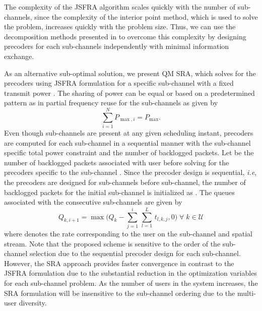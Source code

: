 The complexity of the \ac{JSFRA} algorithm scales quickly with the number of sub-channels, since the complexity of the interior point method, which is used to solve the problem, increases quickly with the problem size. Thus, we can use the decomposition methods presented in \cite{palomar2006tutorial,boyd2011distributed} to overcome this complexity by designing precoders for each sub-channels independently with minimal information exchange.

As an alternative sub-optimal solution, we present \acl{QM} \ac{SRA}, which solves for the precoders using \ac{JSFRA} formulation for a specific sub-channel  with a fixed transmit power . The sharing of power can be equal or based on a predetermined pattern as in partial frequency reuse for the sub-channels as given by
\begin{equation}
\sum_{i=1}^N P_{\max,i} = P_{\max}.
\end{equation}
Even though  sub-channels are present at any given scheduling instant, precoders are computed for each sub-channel in a sequential manner with the sub-channel specific total power constraint  and the number of backlogged packets. Let  be the number of backlogged packets associated with user  before solving for the precoders specific to the sub-channel . Since the precoder design is sequential, \textit{i.e}, the precoders are designed for sub-channels \me{[0,i-1]} before  sub-channel, the number of backlogged packets for the initial sub-channel is initialized as . The queues associated with the consecutive sub-channels are given by
\begin{equation}	\label{eqn-weight}
	Q_{k,i+1} = \max \Big ( Q_k - \sum_{j = 1}^{i} \, \sum_{l = 1}^{L} \, t_{l,k,j} ,0 \Big ) \; \forall \; k \in \mathcal{U}
\end{equation}
where  denotes the rate corresponding to the user  on the  sub-channel and  spatial stream. Note that the proposed scheme is sensitive to the order of the sub-channel selection due to the sequential precoder design for each sub-channel. However, the \ac{SRA} approach provides faster convergence in contrast to the \ac{JSFRA} formulation due to the substantial reduction in the optimization variables for each sub-channel problem. As the number of users in the system increases, the \ac{SRA} formulation will be insensitive to the sub-channel ordering due to the multi-user diversity.
